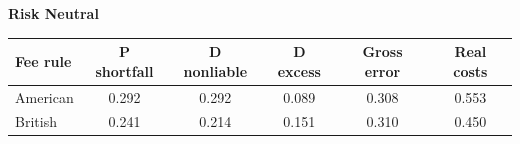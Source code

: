 \documentclass[10pt,border=5pt,varwidth=17cm]{standalone}
\begin{document}
\begingroup
\small
\setlength{\tabcolsep}{5pt}
\renewcommand{\arraystretch}{1.20}
\noindent\textbf{Risk Neutral}\par\smallskip
\noindent\begin{tabularx}{\linewidth}{@{}>{\raggedright\arraybackslash}Xccccc@{}}
\toprule
\textbf{Fee rule} & \textbf{P shortfall} & \textbf{D nonliable} & \textbf{D excess} & \textbf{Gross error} & \textbf{Real costs} \\
\midrule
American & 0.292 & 0.292 & 0.089 & 0.308 & 0.553 \\
British & 0.241 & 0.214 & 0.151 & 0.310 & 0.450 \\
\bottomrule\end{tabularx}\par\medskip
\endgroup
\end{document}
